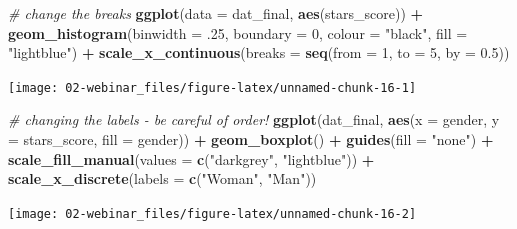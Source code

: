 \documentclass[
  oneside]{book}
\newenvironment{Shaded}{\begin{snugshade}}{\end{snugshade}}
\newcommand{\AttributeTok}[1]{\textcolor[rgb]{0.13,0.29,0.53}{#1}}
\newcommand{\CommentTok}[1]{\textcolor[rgb]{0.56,0.35,0.01}{\textit{#1}}}
\newcommand{\DecValTok}[1]{\textcolor[rgb]{0.00,0.00,0.81}{#1}}
\newcommand{\FloatTok}[1]{\textcolor[rgb]{0.00,0.00,0.81}{#1}}
\newcommand{\FunctionTok}[1]{\textcolor[rgb]{0.13,0.29,0.53}{\textbf{#1}}}
\newcommand{\NormalTok}[1]{#1}
\newcommand{\SpecialCharTok}[1]{\textcolor[rgb]{0.81,0.36,0.00}{\textbf{#1}}}
\newcommand{\StringTok}[1]{\textcolor[rgb]{0.31,0.60,0.02}{#1}}
\begin{document}
\begin{Shaded}
\begin{Highlighting}[]
\CommentTok{\# change the breaks}
\FunctionTok{ggplot}\NormalTok{(}\AttributeTok{data =}\NormalTok{ dat\_final, }\FunctionTok{aes}\NormalTok{(stars\_score)) }\SpecialCharTok{+}
  \FunctionTok{geom\_histogram}\NormalTok{(}\AttributeTok{binwidth =}\NormalTok{ .}\DecValTok{25}\NormalTok{, }
                 \AttributeTok{boundary =} \DecValTok{0}\NormalTok{, }
                 \AttributeTok{colour =} \StringTok{"black"}\NormalTok{,}
                 \AttributeTok{fill =} \StringTok{"lightblue"}\NormalTok{) }\SpecialCharTok{+}
  \FunctionTok{scale\_x\_continuous}\NormalTok{(}\AttributeTok{breaks =} \FunctionTok{seq}\NormalTok{(}\AttributeTok{from =} \DecValTok{1}\NormalTok{, }\AttributeTok{to =} \DecValTok{5}\NormalTok{, }\AttributeTok{by =} \FloatTok{0.5}\NormalTok{))}
\end{Highlighting}
\end{Shaded}

\begin{center}\texttt{[image: 02-webinar\_files/figure-latex/unnamed-chunk-16-1]} \end{center}

\begin{Shaded}
\begin{Highlighting}[]
\CommentTok{\# changing the labels {-} be careful of order!}
\FunctionTok{ggplot}\NormalTok{(dat\_final, }\FunctionTok{aes}\NormalTok{(}\AttributeTok{x =}\NormalTok{ gender, }\AttributeTok{y =}\NormalTok{ stars\_score, }\AttributeTok{fill =}\NormalTok{ gender)) }\SpecialCharTok{+}
  \FunctionTok{geom\_boxplot}\NormalTok{() }\SpecialCharTok{+}
  \FunctionTok{guides}\NormalTok{(}\AttributeTok{fill =} \StringTok{"none"}\NormalTok{) }\SpecialCharTok{+}
  \FunctionTok{scale\_fill\_manual}\NormalTok{(}\AttributeTok{values =} \FunctionTok{c}\NormalTok{(}\StringTok{"darkgrey"}\NormalTok{, }\StringTok{"lightblue"}\NormalTok{)) }\SpecialCharTok{+}
  \FunctionTok{scale\_x\_discrete}\NormalTok{(}\AttributeTok{labels =} \FunctionTok{c}\NormalTok{(}\StringTok{"Woman"}\NormalTok{, }\StringTok{"Man"}\NormalTok{))}
\end{Highlighting}
\end{Shaded}

\begin{center}\texttt{[image: 02-webinar\_files/figure-latex/unnamed-chunk-16-2]} \end{center}
\end{document}
